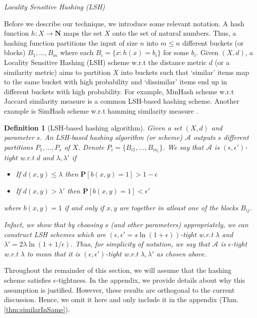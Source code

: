 \documentclass[12pt]{article}
\newtheorem{definition}[theorem]{Definition}
\newcommand{\mb}{\mathbf}
\newcommand{\mc}{\mathcal}
\begin{document}
\noindent\textit{Locality Sensitive Hashing (LSH)}

\vspace{0.02in}\noindent Before we describe our technique, we introduce some relevant notation. A hash function $h: X \rightarrow \mb N$ maps the set $X$ onto the set of natural numbers. Thus, a hashing function partitions the input of size $n$ into $m \le n$ different buckets (or blocks) $B_1, \ldots, B_m$ where each $B_i = \{x : h(x) = b_i\}$ for some $b_i$. Given $(X, d)$, a Locality Sensitive Hashing (LSH) scheme w.r.t the distance metric $d$ (or a similarity metric) aims to partition $X$ into buckets such that `similar' items map to the same bucket with high probability and `dissimilar' items end up in different buckets with high probability. For example, MinHash scheme w.r.t Jaccard similarity measure \cite{broder2000min, broder1997resemblance} is a common LSH-based hashing scheme. Another example is SimHash scheme w.r.t hamming similarity measure \cite{charikar2002similarity}. 


\begin{definition}[LSH-based hashing algorithm]
\label{defn:LSHProperty}
Given a set $(X, d)$ and parameter $s$. An LSH-based hashing algorithm (or scheme) $\mc A$ outputs $s$ different partitions $P_1, \ldots, P_s$ of $X$. Denote $P_i = \{B_{i1}, \ldots, B_{in_i}\}$. We say that $\mc A$ is $(\epsilon, \epsilon')$-tight w.r.t $d$ and $\lambda, \lambda'$ if 

\begin{itemize}
	\item If $d(x, y) \le \lambda$ then  ${\mb P} [ b(x, y) = 1 ]  >  1 - \epsilon$
	\item If $d(x, y) > \lambda'$ then ${\mb P} [ b(x, y) = 1 ] < \epsilon'$
\end{itemize}
where $b(x, y) = 1$ if and only if $x, y$ are together in atleast one of the blocks $B_{ij}$.

Infact, we show that by choosing $s$ (and other parameters) appropriately, we can construct LSH schemes which are $(\epsilon, \epsilon'=s\ln (1+\epsilon))$-tight w.r.t $\lambda$ and $\lambda' = 2\lambda \ln (1+1/\epsilon)$. Thus, for simplicity of notation, we say that $\mc A$ is $\epsilon$-tight w.r.t $\lambda$ to mean that it is $(\epsilon, \epsilon')$-tight w.r.t $\lambda, \lambda'$ as chosen above.
\end{definition}

\noindent Throughout the remainder of this section, we will assume that the hashing scheme satisfies $\epsilon$-tightness. In the appendix, we provide details about why this assumption is justified. However, these results are orthogonal to the current discussion. Hence, we omit it here and only include it in the appendix (Thm. \ref{thm:similarInSame}).  
\end{document}
